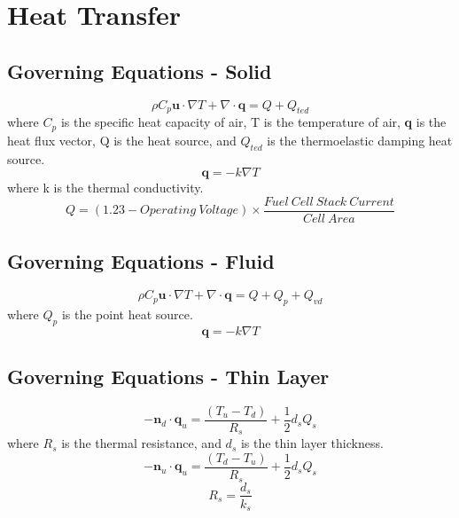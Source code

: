 \documentclass{report}
\begin{document}
    \section{Heat Transfer}
        \subsection{Governing Equations - Solid}
            \begin{equation}
                \rho C_{p} \textbf{u} \cdot \nabla T + \nabla \cdot \textbf{q} = Q + Q_{ted}
            \end{equation}
                \noindent where \(C_{p}\) is the specific heat capacity of air, T is the temperature of air, \textbf{q} is the heat flux vector, Q is the heat source, and \(Q_{ted}\) is the thermoelastic damping heat source.
            \begin{equation}
                \textbf{q} = -k \nabla T
            \end{equation}
                \noindent where k is the thermal conductivity. 
            \begin{equation}
                Q = (1.23 - Operating\ Voltage) \times \frac{Fuel\ Cell\ Stack\ Current}{Cell\ Area}
            \end{equation}
                
        \subsection{Governing Equations - Fluid}
            \begin{equation}
                \rho C_{p} \textbf{u} \cdot \nabla T + \nabla \cdot \textbf{q} = Q + Q_{p} + Q_{vd} %
            \end{equation}
            \noindent where \(Q_{p}\) is the point heat source.
            \begin{equation}
                \textbf{q} = -k \nabla T
            \end{equation}
        
        \subsection{Governing Equations - Thin Layer}
            \begin{equation}
                -\textbf{n}_{d} \cdot \textbf{q}_{u} = \frac{(T_{u} - T_{d})}{R_{s}} + \frac{1}{2} d_{s} Q_{s}
            \end{equation}
            \noindent where \(R_s\) is the thermal resistance, and \(d_s\) is the thin layer thickness. 
            \begin{equation}
                -\textbf{n}_{u} \cdot \textbf{q}_{u} = \frac{(T_{d} - T_{u})}{R_{s}} + \frac{1}{2} d_{s} Q_{s}
            \end{equation}
            \begin{equation}
                R_{s} = \frac{d_{s}}{k_{s}}
            \end{equation}
        
\end{document}
